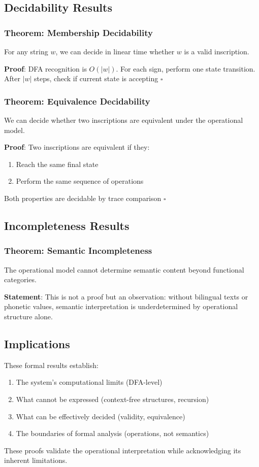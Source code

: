 \subsection{Decidability Results}

\subsubsection{Theorem: Membership Decidability}
For any string $w$, we can decide in linear time whether $w$ is a valid inscription.

\textbf{Proof}: DFA recognition is $O(|w|)$. For each sign, perform one state transition. After $|w|$ steps, check if current state is accepting $\square$

\subsubsection{Theorem: Equivalence Decidability}
We can decide whether two inscriptions are equivalent under the operational model.

\textbf{Proof}: Two inscriptions are equivalent if they:
\begin{enumerate}
    \item Reach the same final state
    \item Perform the same sequence of operations
\end{enumerate}
Both properties are decidable by trace comparison $\square$

\subsection{Incompleteness Results}

\subsubsection{Theorem: Semantic Incompleteness}
The operational model cannot determine semantic content beyond functional categories.

\textbf{Statement}: This is not a proof but an observation: without bilingual texts or phonetic values, semantic interpretation is underdetermined by operational structure alone.

\subsection{Implications}

These formal results establish:
\begin{enumerate}
    \item The system's computational limits (DFA-level)
    \item What cannot be expressed (context-free structures, recursion)
    \item What can be effectively decided (validity, equivalence)
    \item The boundaries of formal analysis (operations, not semantics)
\end{enumerate}

These proofs validate the operational interpretation while acknowledging its inherent limitations.
